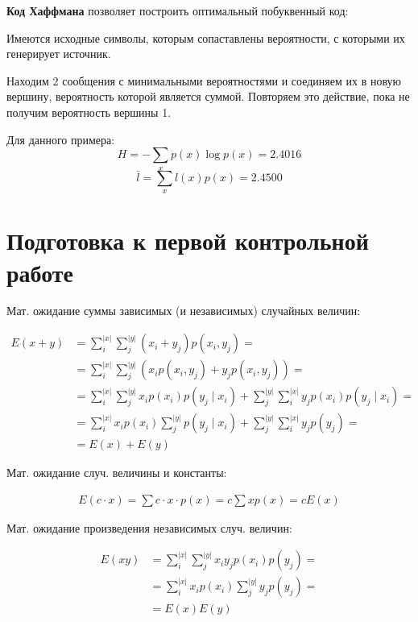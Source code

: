 \textbf{Код Хаффмана} позволяет построить оптимальный побуквенный код:


Имеются исходные символы, которым сопаставлены вероятности, с которыми их
генерирует источник.

Находим 2 сообщения с минимальными вероятностями и соединяем их в новую
вершину, вероятность которой является суммой. Повторяем это действие, пока не
получим вероятность вершины 1.

Для данного примера:
\[
    H = - \sum_x p(x) \log p(x) = 2.4016
\]
\[
    \bar l  = \sum_x l(x) p(x) = 2.4500
\]

\section{Подготовка к первой контрольной работе}

Мат. ожидание суммы зависимых (и независимых) случайных величин:

\begin{align*}
    E(x + y) &= \sum_i^{|x|} \sum_j^{|y|} (x_i + y_j) p(x_i, y_j) =
\\
             &= \sum_i^{|x|} \sum_j^{|y|} (x_i p(x_i, y_j) + y_j p(x_i, y_j)) =
             \\
             &= \sum_i^{|x|} \sum_j^{|y|} x_i p(x_i) p(y_j \mid x_i) +
             \sum_j^{|y|} \sum_i^{|x|} y_j p(x_i) p(y_j \mid x_i) =
             \\
             &= \sum_i^{|x|} x_i p(x_i) \sum_j^{|y|} p(y_j \mid x_i) +
             \sum_j^{|y|} \sum_i^{|x|} y_j p(y_j) =
\\
             &= E(x) + E(y)
\end{align*}

Мат. ожидание случ. величины и константы:

\begin{align*}
    E(c \cdot x) = \sum c \cdot x \cdot p(x)  = c \sum x p(x) = c E(x)
\end{align*}

Мат. ожидание произведения независимых случ. величин:

\begin{align*}
    E(xy) &= \sum_i^{|x|} \sum_j^{|y|} x_i y_j p(x_i) p(y_j) =
    \\
          &= \sum_i^{|x|} x_i p(x_i) \sum_j^{|y|} y_j p(y_j) =
          \\
          &= E(x)E(y)
\end{align*}

